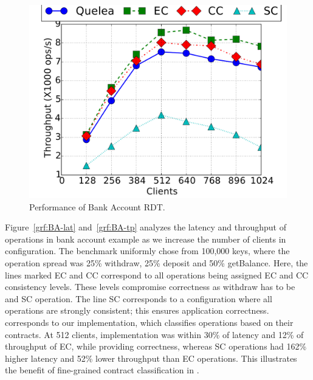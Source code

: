 \begin{figure}
  \centering
	\includegraphics[width=0.5\columnwidth]{Figures/BA-legend.pdf}
	\caption{Performance of Bank Account RDT.}
  \label{grf:BA_perf}
\end{figure}

Figure~\ref{grf:BA-lat} and~\ref{grf:BA-tp} analyzes the latency and throughput
of operations in bank account example as we increase the number of clients in
 configuration. The benchmark uniformly chose from 100,000 keys, where
the operation spread was 25\% withdraw, 25\% deposit and 50\% getBalance. Here,
the lines marked EC and CC correspond to all operations being assigned EC and
CC consistency levels. These levels compromise correctness as withdraw has to
be and SC operation. The line SC corresponds to a configuration where all
operations are strongly consistent; this ensures application correctness. \name
corresponds to our implementation, which classifies operations based on their
contracts. At 512 clients, \name implementation was within 30\% of latency and
12\% of throughput of EC, while providing correctness, whereas SC operations
had 162\% higher latency and 52\% lower throughput than EC operations. This
illustrates the benefit of fine-grained contract classification in \name.
